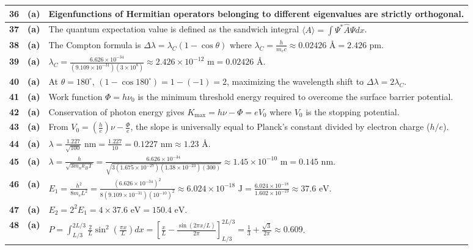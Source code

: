 {\begin{tabularx}{\textwidth}{|c|c|X|}
\textbf{36} & \textbf{(a)} & Eigenfunctions of Hermitian operators belonging to different eigenvalues are strictly orthogonal. \\ \hline
\textbf{37} & \textbf{(a)} & The quantum expectation value is defined as the sandwich integral $\langle A \rangle = \int \Psi^* \hat{A} \Psi dx$. \\ \hline
\textbf{38} & \textbf{(a)} & The Compton formula is $\Delta\lambda = \lambda_C(1 - \cos\theta)$ where $\lambda_C = \frac{h}{m_e c} \approx 0.02426\text{ \AA} = 2.426\text{ pm}$. \\ \hline
\textbf{39} & \textbf{(a)} & $\lambda_C = \frac{6.626 \times 10^{-34}}{(9.109 \times 10^{-31})(3 \times 10^8)} \approx 2.426 \times 10^{-12}\text{ m} = 0.02426\text{ \AA}$. \\ \hline
\textbf{40} & \textbf{(a)} & At $\theta = 180^\circ$, $(1 - \cos 180^\circ) = 1 - (-1) = 2$, maximizing the wavelength shift to $\Delta\lambda = 2\lambda_C$. \\ \hline
\textbf{41} & \textbf{(a)} & Work function $\Phi = h\nu_0$ is the minimum threshold energy required to overcome the surface barrier potential. \\ \hline
\textbf{42} & \textbf{(a)} & Conservation of photon energy gives $K_{\text{max}} = h\nu - \Phi = e V_0$ where $V_0$ is the stopping potential. \\ \hline
\textbf{43} & \textbf{(a)} & From $V_0 = \left(\frac{h}{e}\right)\nu - \frac{\Phi}{e}$, the slope is universally equal to Planck's constant divided by electron charge ($h/e$). \\ \hline
\textbf{44} & \textbf{(a)} & $\lambda = \frac{1.227}{\sqrt{100}}\text{ nm} = \frac{1.227}{10} = 0.1227\text{ nm} \approx 1.23\text{ \AA}$. \\ \hline
\textbf{45} & \textbf{(a)} & $\lambda = \frac{h}{\sqrt{3 m_n k_B T}} = \frac{6.626 \times 10^{-34}}{\sqrt{3(1.675 \times 10^{-27})(1.38 \times 10^{-23})(300)}} \approx 1.45 \times 10^{-10}\text{ m} = 0.145\text{ nm}$. \\ \hline
\textbf{46} & \textbf{(a)} & $E_1 = \frac{h^2}{8 m_e L^2} = \frac{(6.626 \times 10^{-34})^2}{8(9.109 \times 10^{-31})(10^{-10})^2} \approx 6.024 \times 10^{-18}\text{ J} = \frac{6.024 \times 10^{-18}}{1.602 \times 10^{-19}} \approx 37.6\text{ eV}$. \\ \hline
\textbf{47} & \textbf{(a)} & $E_2 = 2^2 E_1 = 4 \times 37.6\text{ eV} = 150.4\text{ eV}$. \\ \hline
\textbf{48} & \textbf{(a)} & $P = \int_{L/3}^{2L/3}\frac{2}{L}\sin^2(\frac{\pi x}{L})dx = \left[\frac{x}{L} - \frac{\sin(2\pi x/L)}{2\pi}\right]_{L/3}^{2L/3} = \frac{1}{3} + \frac{\sqrt{3}}{2\pi} \approx 0.609$. \\ \hline

\end{tabularx}}
